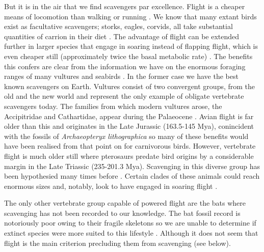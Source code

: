 \documentclass[a4paper,12pt]{article}
\begin{document}
But it is in the air that we find scavengers par excellence. 
Flight is a cheaper means of locomotion than walking or running \citep{tucker1975energetic}. 
We know that many extant birds exist as facultative scavengers; storks, eagles, corvids, all take substantial quantities of carrion in their diet \citep{kendall2013alternative}.
The advantage of flight can be extended further in larger species that engage in soaring instead of flapping flight, which is even cheaper still (approximately twice the basal metabolic rate) \citep{hedenstrom1993migration,spivey2014analysing}.
The benefits this confers are clear from the information we have on the enormous foraging ranges of many vultures \citep{spiegel2013factors} and seabirds \citep{thaxter2012seabird}.
In the former case we have the best known scavengers on Earth. 
Vultures consist of two convergent groups, from the old and the new world and represent the only example of obligate vertebrate scavengers today.
The families from which modern vultures arose, the Accipitridae and Cathartidae, appear during the Palaeocene \citep[66 - 56 Mya; ][]{Jetz2012, Jarvis2014}.
Avian flight is far older than this and originates in the Late Jurassic (163.5-145 Mya), conincident with the fossils of \textit{Archaeopteryx lithographica} so many of these benefits would have been realised from that point on for carnivorous birds.
However, vertebrate flight is much older still where pterosaurs predate bird origins by a considerable margin in the Late Triassic (235-201.3 Mya).
Scavenging in this diverse group has been hypothesied many times before \citep{witton2008reappraisal}.
Certain clades of these animals could reach enormous sizes \citep[e.g. Azhdarchids with wingspans of 11 metres; ][]{witton2010size} and, notably, look to have engaged in soaring flight \citep{witton2010size}.

The only other vertebrate group capable of powered flight are the bats where scavenging has not been recorded to our knowledge.
The bat fossil record is notoriously poor owing to their fragile skeletons so we are unable to determine if extinct species were more suited to this lifestyle \citep{eiting2009global}. %
Although it does not seem that flight is the main criterion precluding them from scavenging (see below).
\end{document}

